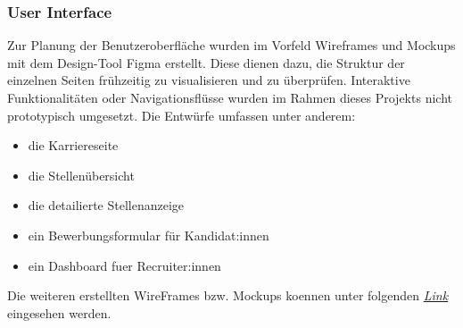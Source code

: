 \subsubsection{User Interface}
Zur Planung der Benutzeroberfläche wurden im Vorfeld Wireframes und Mockups mit dem Design-Tool Figma erstellt. 
Diese dienen dazu, die Struktur der einzelnen Seiten frühzeitig zu visualisieren und zu überprüfen. 
Interaktive Funktionalitäten oder Navigationsflüsse wurden im Rahmen dieses Projekts nicht prototypisch umgesetzt. 
Die Entwürfe umfassen unter anderem:
\begin{itemize}
	\item die Karriereseite
	\item die Stellenübersicht
	\item die detailierte Stellenanzeige
	\item ein Bewerbungsformular für Kandidat:innen
	\item ein Dashboard fuer Recruiter:innen  
\end{itemize}
Die weiteren erstellten WireFrames bzw. Mockups koennen unter folgenden 
\href{https://www.figma.com/design/0LDsbppkYlQgEbpulk5ud9/ATS-WebApp?node-id=20-46&t=cHVE2zw3fKD8hl14}{\textit{Link}} eingesehen werden.
